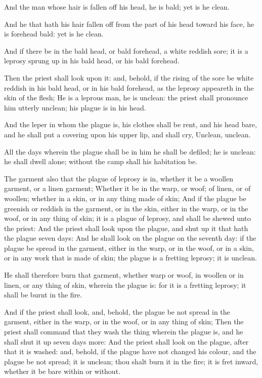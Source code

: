 \verse And the man whose hair is fallen off his head, he is bald; yet is he clean.

\verse And he that hath his hair fallen off from the part of his head toward his face, he is forehead bald: yet is he clean.

\verse And if there be in the bald head, or bald forehead, a white reddish sore; it is a leprosy sprung up in his bald head, or his bald forehead.

\verse Then the priest shall look upon it: and, behold, if the rising of the sore be white reddish in his bald head, or in his bald forehead, as the leprosy appeareth in the skin of the flesh; \verse He is a leprous man, he is unclean: the priest shall pronounce him utterly unclean; his plague is in his head.

\verse And the leper in whom the plague is, his clothes shall be rent, and his head bare, and he shall put a covering upon his upper lip, and shall cry, Unclean, unclean.

\verse All the days wherein the plague shall be in him he shall be defiled; he is unclean: he shall dwell alone; without the camp shall his habitation be.

\verse The garment also that the plague of leprosy is in, whether it be a woollen garment, or a linen garment; \verse Whether it be in the warp, or woof; of linen, or of woollen; whether in a skin, or in any thing made of skin; \verse And if the plague be greenish or reddish in the garment, or in the skin, either in the warp, or in the woof, or in any thing of skin; it is a plague of leprosy, and shall be shewed unto the priest: \verse And the priest shall look upon the plague, and shut up it that hath the plague seven days: \verse And he shall look on the plague on the seventh day: if the plague be spread in the garment, either in the warp, or in the woof, or in a skin, or in any work that is made of skin; the plague is a fretting leprosy; it is unclean.

\verse He shall therefore burn that garment, whether warp or woof, in woollen or in linen, or any thing of skin, wherein the plague is: for it is a fretting leprosy; it shall be burnt in the fire.

\verse And if the priest shall look, and, behold, the plague be not spread in the garment, either in the warp, or in the woof, or in any thing of skin; \verse Then the priest shall command that they wash the thing wherein the plague is, and he shall shut it up seven days more: \verse And the priest shall look on the plague, after that it is washed: and, behold, if the plague have not changed his colour, and the plague be not spread; it is unclean; thou shalt burn it in the fire; it is fret inward, whether it be bare within or without.

